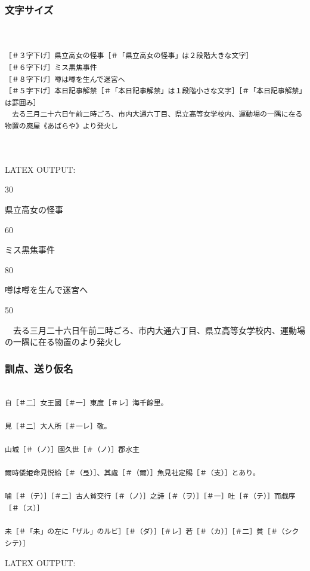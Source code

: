 \documentclass[a4paper,tate]{jlreq}
\begin{document}
\newpage
\subsubsection*{文字サイズ}
\footnotesize
\linespread{1.0}
\begin{verbatim}


［＃３字下げ］県立高女の怪事［＃「県立高女の怪事」は２段階大きな文字］
［＃６字下げ］ミス黒焦事件
［＃８字下げ］噂は噂を生んで迷宮へ
［＃５字下げ］本日記事解禁［＃「本日記事解禁」は１段階小さな文字］［＃「本日記事解禁」は罫囲み］
　去る三月二十六日午前二時ごろ、市内大通六丁目、県立高等女学校内、運動場の一隅に在る物置の廃屋《あばらや》より発火し



\end{verbatim}
\linespread{1.4}
\normalsize
LATEX OUTPUT:
\zw



\begin{azconvIndented}{3\zw}{0\zw}

{\Large 県立高女の怪事}

\end{azconvIndented}
\begin{azconvIndented}{6\zw}{0\zw}

ミス黒焦事件

\end{azconvIndented}
\begin{azconvIndented}{8\zw}{0\zw}

噂は噂を生んで迷宮へ

\end{azconvIndented}
\begin{azconvIndented}{5\zw}{0\zw}


\end{azconvIndented}
　去る三月二十六日午前二時ごろ、市内大通六丁目、県立高等女学校内、運動場の一隅に在る物置のより発火し





\newpage
\subsubsection*{訓点、送り仮名}
\footnotesize
\linespread{1.0}
\begin{verbatim}

自［＃二］女王國［＃一］東度［＃レ］海千餘里。

見［＃二］大人所［＃一レ］敬。

山城［＃（ノ）］國久世［＃（ノ）］郡水主

爾時倭姫命見悦給［＃（弖）］、其處［＃（爾）］魚見社定賜［＃（支）］とあり。

噛［＃（テ）］［＃二］古人貧交行［＃（ノ）］之詩［＃（ヲ）］［＃一］吐［＃（テ）］而戯序［＃（ス）］

未［＃「未」の左に「ザル」のルビ］［＃（ダ）］［＃レ］若［＃（カ）］［＃二］貧［＃（シクシテ）］

\end{verbatim}
\linespread{1.4}
\normalsize
LATEX OUTPUT:
\zw
\end{document}
